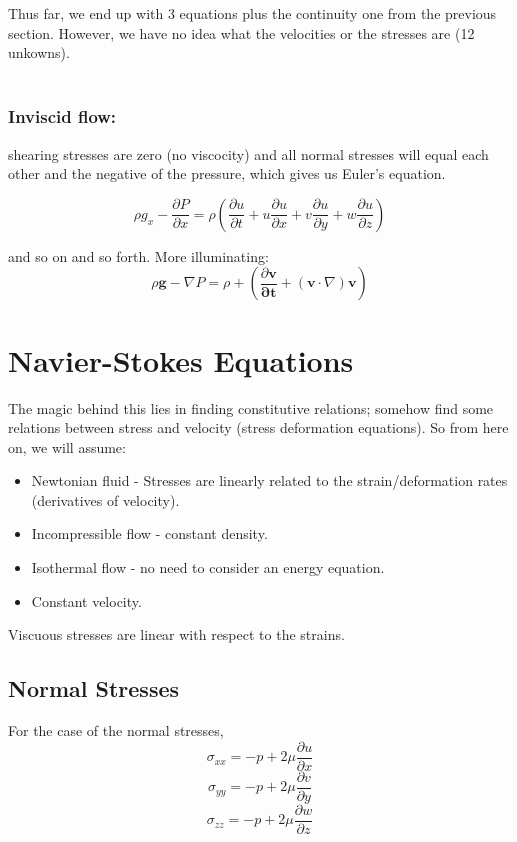 \documentclass[10pt,a4paper,draft]{article}
\begin{document}
Thus far, we end up with 3 equations plus the continuity one from the previous section.
However, we have no idea what the velocities or the stresses are (12 unkowns). 
\\~\\

\subsubsection{Inviscid flow:} 
shearing stresses are zero (no viscocity) and all normal stresses will equal each other and the negative of the pressure, which gives us Euler's equation. 

$$
\rho g_x - \frac{\partial P}{\partial x} 
= \rho
\left(
	\frac{\partial u}{\partial t} 
+ u \frac{\partial u}{\partial x}
+ v \frac{\partial u}{\partial y}
+ w \frac{\partial u}{\partial z}
\right)
$$

and so on and so forth.
More illuminating: 
$$
\rho \mathbf{g} - \nabla P 
= \rho + \left( 
	\frac{\partial \mathbf{v}}{\mathbf{\partial t}}
	+ \left(\mathbf{v} \cdot \nabla \right) \mathbf{v}
\right) 
$$



\section{Navier-Stokes Equations}
The magic behind this lies in finding constitutive relations; somehow find some relations between stress and velocity (stress deformation equations).
So from here on, we will assume:

\begin{itemize}
\item Newtonian fluid - Stresses are linearly related to the strain/deformation rates (derivatives of velocity).
\item Incompressible flow - constant density.
\item Isothermal flow - no need to consider an energy equation.
\item Constant velocity.
\end{itemize}

Viscuous stresses are linear with respect to the strains.

\subsection{Normal Stresses}
For the case of the normal stresses,
$$
\sigma_{xx} = -p + 2\mu \frac{\partial u}{\partial x}
$$
$$
\sigma_{yy} = -p + 2\mu \frac{\partial v}{\partial y}
$$
$$
\sigma_{zz} = -p + 2\mu \frac{\partial w}{\partial z}
$$
\end{document}

